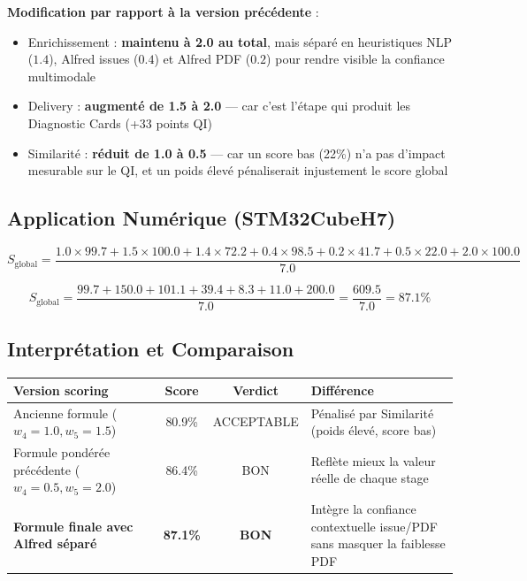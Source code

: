 \documentclass[12pt,a4paper]{report}
\begin{document}
\textbf{Modification par rapport à la version précédente} :
\begin{itemize}
  \item Enrichissement : \textbf{maintenu à 2.0 au total}, mais séparé en heuristiques NLP ($1.4$), Alfred issues ($0.4$) et Alfred PDF ($0.2$) pour rendre visible la confiance multimodale
  \item Delivery : \textbf{augmenté de 1.5 à 2.0} --- car c'est l'étape qui produit les Diagnostic Cards (+33 points QI)
  \item Similarité : \textbf{réduit de 1.0 à 0.5} --- car un score bas (22\%) n'a pas d'impact mesurable sur le QI, et un poids élevé pénaliserait injustement le score global
\end{itemize}

\subsection{Application Numérique (STM32CubeH7)}

\begin{equation}
S_{\text{global}} = \frac{1.0 \times 99.7 + 1.5 \times 100.0 + 1.4 \times 72.2 + 0.4 \times 98.5 + 0.2 \times 41.7 + 0.5 \times 22.0 + 2.0 \times 100.0}{7.0}
\end{equation}

\begin{equation}
S_{\text{global}} = \frac{99.7 + 150.0 + 101.1 + 39.4 + 8.3 + 11.0 + 200.0}{7.0} = \frac{609.5}{7.0} = \boxed{87.1\%}
\label{eq:score_calcul}
\end{equation}

\subsection{Interprétation et Comparaison}

\begin{longtable}{lccp{5cm}}
\toprule
\textbf{Version scoring} & \textbf{Score} & \textbf{Verdict} & \textbf{Différence} \\
\midrule
Ancienne formule ($w_4=1.0, w_5=1.5$) & 80.9\% & ACCEPTABLE & Pénalisé par Similarité (poids élevé, score bas) \\
Formule pondérée précédente ($w_4=0.5, w_5=2.0$) & 86.4\% & BON & Reflète mieux la valeur réelle de chaque stage \\
\textbf{Formule finale avec Alfred séparé} & \textbf{87.1\%} & \textbf{BON} & Intègre la confiance contextuelle issue/PDF sans masquer la faiblesse PDF \\
\bottomrule
\end{longtable}
\end{document}
